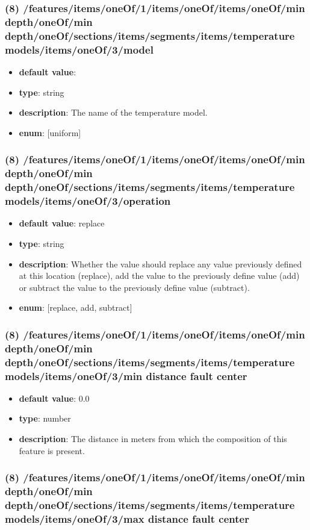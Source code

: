 \subsubsection{(8) /features/items/oneOf/1/items/oneOf/items/oneOf/min depth/oneOf/min depth/oneOf/sections/items/segments/items/temperature models/items/oneOf/3/model}
\begin{itemize}[leftmargin=8em]\item {\bf default value}: 
\item {\bf type}: string
\item {\bf description}: The name of the temperature model.
\item {\bf enum}: [uniform]\end{itemize}\subsubsection{(8) /features/items/oneOf/1/items/oneOf/items/oneOf/min depth/oneOf/min depth/oneOf/sections/items/segments/items/temperature models/items/oneOf/3/operation}
\begin{itemize}[leftmargin=8em]\item {\bf default value}: replace
\item {\bf type}: string
\item {\bf description}: Whether the value should replace any value previously defined at this location (replace), add the value to the previously define value (add) or subtract the value to the previously define value (subtract).
\item {\bf enum}: [replace, add, subtract]\end{itemize}\subsubsection{(8) /features/items/oneOf/1/items/oneOf/items/oneOf/min depth/oneOf/min depth/oneOf/sections/items/segments/items/temperature models/items/oneOf/3/min distance fault center}
\begin{itemize}[leftmargin=8em]\item {\bf default value}: 0.0
\item {\bf type}: number
\item {\bf description}: The distance in meters from which the composition of this feature is present.
\end{itemize}\subsubsection{(8) /features/items/oneOf/1/items/oneOf/items/oneOf/min depth/oneOf/min depth/oneOf/sections/items/segments/items/temperature models/items/oneOf/3/max distance fault center}

